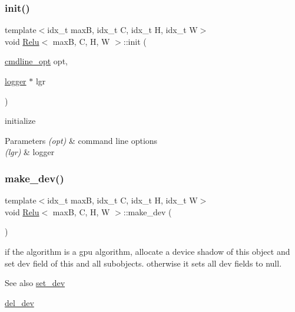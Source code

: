 \subsubsection{\texorpdfstring{init()}{init()}}
{\footnotesize\ttfamily template$<$idx\+\_\+t maxB, idx\+\_\+t C, idx\+\_\+t H, idx\+\_\+t W$>$ \\
void \hyperlink{structRelu}{Relu}$<$ maxB, C, H, W $>$\+::init (\begin{DoxyParamCaption}\item[{\hyperlink{structcmdline__opt}{cmdline\+\_\+opt}}]{opt,  }\item[{\hyperlink{structlogger}{logger} $\ast$}]{lgr }\end{DoxyParamCaption})\hspace{0.3cm}{\ttfamily [inline]}}



initialize 


\begin{DoxyParams}{Parameters}
{\em (opt)} & command line options \\
\hline
{\em (lgr)} & logger \\
\hline
\end{DoxyParams}
\mbox{\label{structRelu_a0109665896b86defceb3b7b5f4869075}} 
\subsubsection{\texorpdfstring{make\+\_\+dev()}{make\_dev()}}
{\footnotesize\ttfamily template$<$idx\+\_\+t maxB, idx\+\_\+t C, idx\+\_\+t H, idx\+\_\+t W$>$ \\
void \hyperlink{structRelu}{Relu}$<$ maxB, C, H, W $>$\+::make\+\_\+dev (\begin{DoxyParamCaption}{ }\end{DoxyParamCaption})\hspace{0.3cm}{\ttfamily [inline]}}



if the algorithm is a gpu algorithm, allocate a device shadow of this object and set dev field of this and all subobjects. otherwise it sets all dev fields to null. 

\begin{DoxySeeAlso}{See also}
\hyperlink{structRelu_a4e32ca92b471641ee2d5c1a252bab167}{set\+\_\+dev} 

\hyperlink{structRelu_a449f220c5cd23217aa463f68a8a4933a}{del\+\_\+dev} 
\end{DoxySeeAlso}
\mbox{\label{structRelu_a4e32ca92b471641ee2d5c1a252bab167}} 
